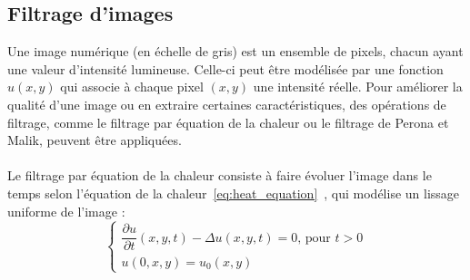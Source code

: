\documentclass{article}
\begin{document}
\subsection{Filtrage d'images}
Une image numérique (en échelle de gris) est un ensemble de pixels, chacun ayant une valeur d'intensité lumineuse. Celle-ci peut être modélisée par une fonction \( u(x,y) \) qui associe à chaque pixel \((x,y)\) une intensité réelle. Pour améliorer la qualité d'une image ou en extraire certaines caractéristiques, des opérations de filtrage, comme le filtrage par équation de la chaleur ou le filtrage de Perona et Malik, peuvent être appliquées.\\ \\

Le filtrage par équation de la chaleur consiste à faire évoluer l'image dans le temps selon l'équation de la chaleur~\ref{eq:heat_equation}~\cite{is104-perona}, qui modélise un lissage uniforme de l'image :
\begin{equation}
  \label{eq:heat_equation}
  \begin{cases}
  \dfrac{\partial u}{\partial t}(x,y,t) - \Delta u(x,y,t) = 0 \text{, pour } t>0 \\
  u(0,x,y) = u_0(x,y)
  \end{cases}
\end{equation}
\end{document}
